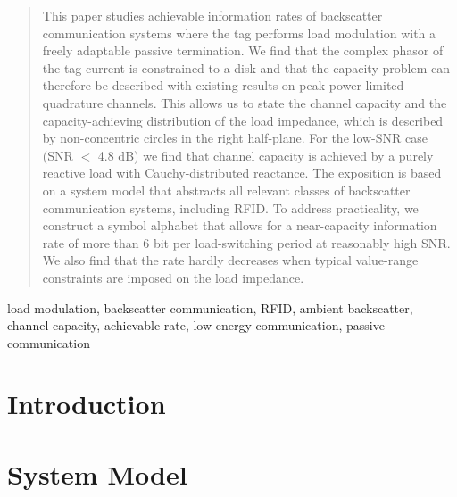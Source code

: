 \documentclass[10pt,conference]{IEEEtran}
\begin{document}
\begin{abstract}
%
This paper studies achievable information rates of backscatter communication systems where the tag performs load modulation with a freely adaptable passive termination. We find that the complex phasor of the tag current is constrained to a disk and that the capacity problem can therefore be described with existing results on peak-power-limited quadrature channels. This allows us to state the channel capacity and the capacity-achieving distribution of the load impedance, which is described by non-concentric circles in the right half-plane. For the low-SNR case (SNR \(<\) 4.8 dB) we find that channel capacity is achieved by a purely reactive load with Cauchy-distributed reactance. The exposition is based on a system model that abstracts all relevant classes of backscatter communication systems, including RFID. To address practicality, we construct a symbol alphabet that allows for a near-capacity information rate of more than 6 bit per load-switching period at reasonably high SNR. We also find that the rate hardly decreases when typical value-range constraints are imposed on the load impedance.
\end{abstract}

\newcommand\OurKeywords{%
load modulation, backscatter communication, RFID, ambient backscatter, channel capacity, achievable rate, low energy communication, passive communication}
% 

\begin{IEEEkeywords}
\OurKeywords
\end{IEEEkeywords}

\section{Introduction}
\label{sec:intro}


\section{System Model}
\label{sec:model}

\end{document}
